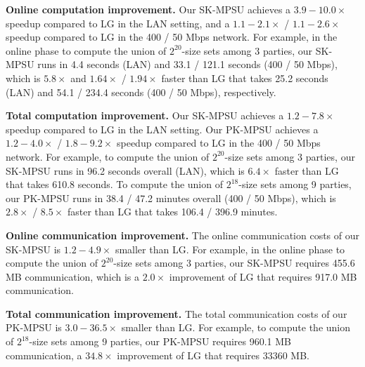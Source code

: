 \begin{trivlist}

\item \textbf{Online computation improvement.} Our SK-MPSU achieves a $3.9-10.0 \times$ speedup compared to LG in the LAN setting, and a $1.1-2.1 \times$ / $1.1-2.6 \times$ speedup compared to LG in the 400 / 50 Mbps network. For example, in the online phase to compute the union of $2^{20}$-size sets among 3 parties, our SK-MPSU runs in 4.4 seconds (LAN) and 33.1 / 121.1 seconds (400 / 50 Mbps), which is $5.8 \times$ and $1.64 \times$ / $1.94 \times$ faster than LG that takes 25.2 seconds (LAN) and 54.1 / 234.4 seconds (400 / 50 Mbps), respectively.

\item \textbf{Total computation improvement.} Our SK-MPSU achieves a $1.2-7.8 \times$ speedup compared to LG in the LAN setting. Our PK-MPSU achieves a $1.2-4.0 \times$ / $1.8-9.2 \times$ speedup compared to LG in the 400 / 50 Mbps network. For example, to compute the union of $2^{20}$-size sets among 3 parties, our SK-MPSU runs in 96.2 seconds overall (LAN), which is $6.4 \times$ faster than LG that takes 610.8 seconds. To compute the union of $2^{18}$-size sets among 9 parties, our PK-MPSU runs in 38.4 / 47.2 minutes overall (400 / 50 Mbps), which is $2.8 \times$ / $8.5 \times$ faster than LG that takes 106.4 / 396.9 minutes.

\item \textbf{Online communication improvement.} The online communication costs of our SK-MPSU is $1.2-4.9 \times$ smaller than LG. For example, in the online phase to compute the union of $2^{20}$-size sets among 3 parties, our SK-MPSU requires 455.6 MB communication, which is a $2.0 \times$ improvement of LG that requires 917.0 MB communication.

\item \textbf{Total communication improvement.} The total communication costs of our PK-MPSU is $3.0-36.5\times$
 smaller than LG. For example, to compute the union of $2^{18}$-size sets among 9 parties, our PK-MPSU requires 960.1 MB communication, a $34.8 \times$ improvement of LG that requires 33360 MB.


\end{trivlist}

